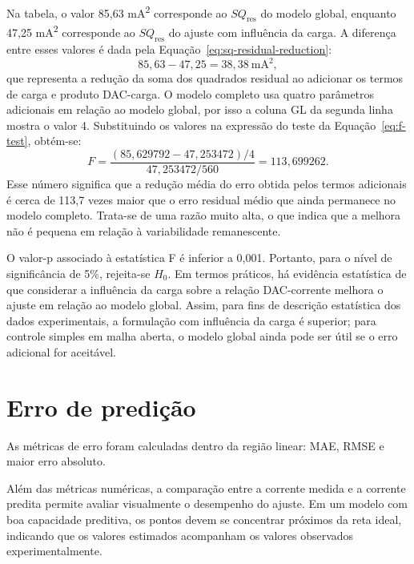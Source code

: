 \documentclass[
  brazilian,
]{article}
\renewcommand{\_}{\oldunderscore\discretionary{}{}{}}
\begin{document}
Na tabela, o valor 85,63 mA\textsuperscript{2} corresponde ao
\(SQ_{\mathrm{res}}\) do modelo global, enquanto 47,25
mA\textsuperscript{2} corresponde ao \(SQ_{\mathrm{res}}\) do ajuste com
influência da carga. A diferença entre esses valores é dada pela
Equação~\ref{eq:sq-residual-reduction}:
\begin{equation}
85{,}63 - 47{,}25 = 38{,}38\ \mathrm{mA}^2,
\label{eq:sq-residual-reduction}
\end{equation}
que representa a redução da soma dos quadrados residual ao adicionar os
termos de carga e produto DAC-carga. O modelo completo usa quatro parâmetros
adicionais em relação ao modelo global, por isso a coluna GL da segunda
linha mostra o valor 4. Substituindo os valores na expressão do teste da
Equação~\ref{eq:f-test}, obtém-se:
\begin{equation}
F =
\frac{(85{,}629792 - 47{,}253472)/4}
{47{,}253472/560}
= 113{,}699262.
\label{eq:f-test-value}
\end{equation}
Esse número significa que a redução média do erro obtida pelos termos
adicionais é cerca de 113,7 vezes maior que o erro residual médio que
ainda permanece no modelo completo. Trata-se de uma razão muito alta, o
que indica que a melhora não é pequena em relação à variabilidade
remanescente.

O valor-p associado à estatística F é inferior a 0,001. Portanto, para o
nível de significância de 5\%, rejeita-se \(H_0\). Em termos práticos, há
evidência estatística de que considerar a influência da carga sobre a
relação DAC-corrente melhora o ajuste em relação ao modelo global. Assim, para
fins de descrição estatística dos dados experimentais, a formulação com
influência da carga é superior; para controle simples em malha aberta, o modelo
global ainda pode ser útil se o erro adicional for aceitável.

\section{Erro de predição}\label{erro-de-prediuxe7uxe3o}

As métricas de erro foram calculadas dentro da região linear: MAE, RMSE
e maior erro absoluto.

Além das métricas numéricas, a comparação entre a corrente medida e a
corrente predita permite avaliar visualmente o desempenho do ajuste. Em
um modelo com boa capacidade preditiva, os pontos devem se concentrar
próximos da reta ideal, indicando que os valores estimados acompanham os
valores observados experimentalmente.
\end{document}
